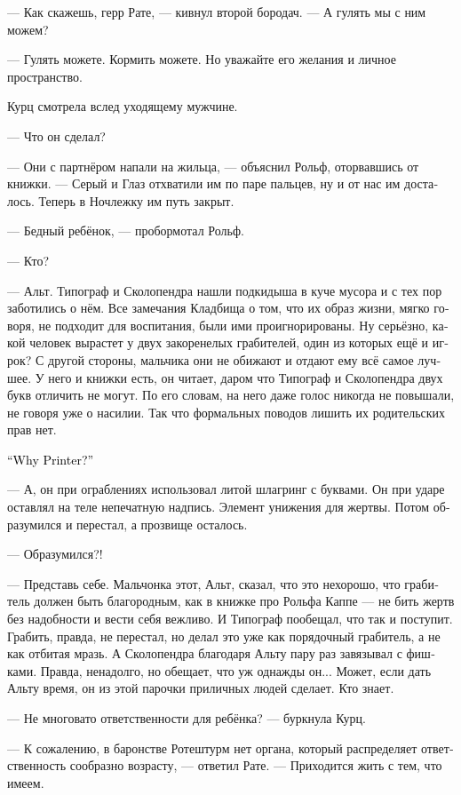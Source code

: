 \documentclass[a4paper,12pt,fleqn]{book}\usepackage{cooltooltips}\usepackage{polyglossia}\setdefaultlanguage[babelshorthands=true]{russian}\setotherlanguage{english}\defaultfontfeatures{Ligatures=TeX,Mapping=tex-text} \usepackage{xcolor}\definecolor{lightgray}{HTML}{bbbbbb}\color{lightgray}\newcommand{\ml}[3]{\textenglish{\textcolor{black}{#3}}}
\begin{document}
--- Как скажешь, герр Рате, --- кивнул второй бородач.
--- А гулять мы с ним можем?

--- Гулять можете.
Кормить можете.
Но уважайте его желания и личное пространство.

Курц смотрела вслед уходящему мужчине.

--- Что он сделал?

--- Они с партнёром напали на жильца, --- объяснил Рольф, оторвавшись от книжки.
--- Серый и Глаз отхватили им по паре пальцев, ну и от нас им досталось.
Теперь в Ночлежку им путь закрыт.

--- Бедный ребёнок, --- пробормотал Рольф.

--- Кто?

--- Альт.
Типограф и Сколопендра нашли подкидыша в куче мусора и с тех пор заботились о нём.
Все замечания Кладбища о том, что их образ жизни, мягко говоря, не подходит для воспитания, были ими проигнорированы.
Ну серьёзно, какой человек вырастет у двух закоренелых грабителей, один из которых ещё и игрок?
С другой стороны, мальчика они не обижают и отдают ему всё самое лучшее.
У него и книжки есть, он читает, даром что Типограф и Сколопендра двух букв отличить не могут.
По его словам, на него даже голос никогда не повышали, не говоря уже о насилии.
Так что формальных поводов лишить их родительских прав нет.

\ml{$0$}
{--- А почему Типограф?}
{``Why Printer?''}

--- А, он при ограблениях использовал литой шлагринг с буквами.
Он при ударе оставлял на теле непечатную надпись.
Элемент унижения для жертвы.
Потом образумился и перестал, а прозвище осталось.

--- Образумился?!

--- Представь себе.
Мальчонка этот, Альт, сказал, что это нехорошо, что грабитель должен быть благородным, как в книжке про Рольфа Каппе --- не бить жертв без надобности и вести себя вежливо.
И Типограф пообещал, что так и поступит.
Грабить, правда, не перестал, но делал это уже как порядочный грабитель, а не как отбитая мразь.
А Сколопендра благодаря Альту пару раз завязывал с фишками.
Правда, ненадолго, но обещает, что уж однажды он...
Может, если дать Альту время, он из этой парочки приличных людей сделает.
Кто знает.

--- Не многовато ответственности для ребёнка? --- буркнула Курц.

--- К сожалению, в баронстве Ротештурм нет органа, который распределяет ответственность сообразно возрасту, --- ответил Рате.
--- Приходится жить с тем, что имеем.
\end{document}
